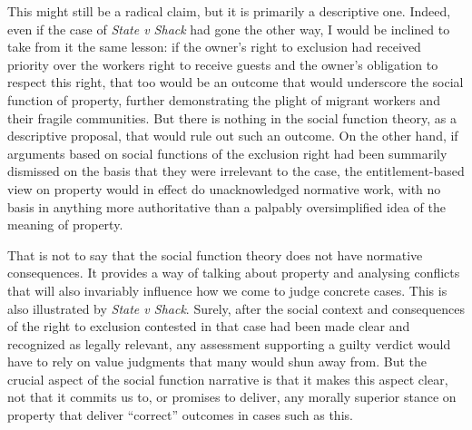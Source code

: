 This might still be a radical claim, but it is primarily a descriptive one. Indeed, even if the case of {\it State v Shack} had gone the other way, I would be inclined to take from it the same lesson: if the owner's right to exclusion had received priority over the workers right to receive guests and the owner's obligation to respect this right, that too would be an outcome that would underscore the social function of property, further demonstrating the plight of migrant workers and their fragile communities. But there is nothing in the social function theory, as a descriptive proposal, that would rule out such an outcome. On the other hand, if arguments based on social functions of the exclusion right had been summarily dismissed on the basis that they were irrelevant to the case, the entitlement-based view on property would in effect do unacknowledged normative work, with no basis in anything more authoritative than a palpably oversimplified idea of the meaning of property.

That is not to say that the social function theory does not have normative consequences. It provides a way of talking about property and analysing conflicts that will also invariably influence how we come to judge concrete cases. This is also illustrated by {\it State v Shack}. Surely, after the social context and consequences of the right to exclusion contested in that case had been made clear and recognized as legally relevant, any assessment supporting a guilty verdict would have to rely on value judgments that many would  shun away from. But the crucial aspect of the social function narrative is that it makes this aspect clear, not that it commits us to, or promises to deliver, any morally superior stance on property that deliver ``correct'' outcomes in cases such as this.

